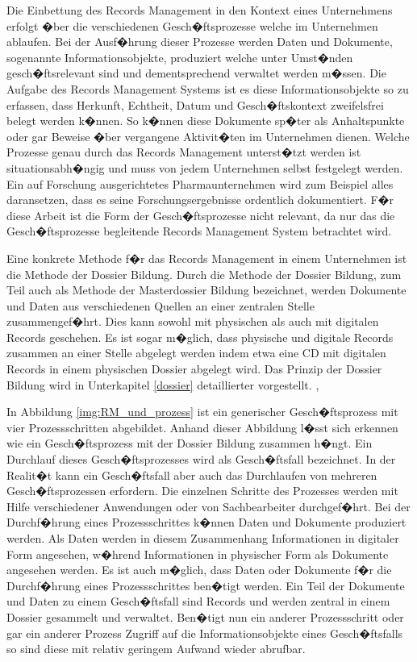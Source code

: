 \documentclass[a4paper,twoside,10pt]{report}
\begin{document}
Die Einbettung des Records Management in den Kontext eines Unternehmens erfolgt �ber die verschiedenen Gesch�ftsprozesse welche im Unternehmen ablaufen. Bei der Ausf�hrung dieser Prozesse werden Daten und Dokumente, sogenannte Informationsobjekte, produziert welche unter Umst�nden gesch�ftsrelevant sind und dementsprechend verwaltet werden m�ssen. Die Aufgabe des Records Management Systems ist es diese Informationsobjekte so zu erfassen, dass Herkunft, Echtheit, Datum und Gesch�ftskontext zweifelsfrei belegt werden k�nnen. So k�nnen diese Dokumente sp�ter als Anhaltspunkte oder gar Beweise �ber vergangene Aktivit�ten im Unternehmen dienen. Welche Prozesse genau durch das Records Management unterst�tzt werden ist situationsabh�ngig und muss von jedem Unternehmen selbst festgelegt werden. Ein auf Forschung ausgerichtetes Pharmaunternehmen wird zum Beispiel alles daransetzen, dass es seine Forschungsergebnisse ordentlich dokumentiert. F�r diese Arbeit ist die Form der Gesch�ftsprozesse nicht relevant, da nur das die Gesch�ftsprozesse begleitende Records Management System betrachtet wird. \cite{krm}

Eine konkrete Methode f�r das Records Management in einem Unternehmen ist die Methode der Dossier Bildung. Durch die Methode der Dossier Bildung, zum Teil auch als Methode der Masterdossier Bildung bezeichnet, werden Dokumente und Daten aus verschiedenen Quellen an einer zentralen Stelle zusammengef�hrt. Dies kann sowohl mit physischen als auch mit digitalen Records geschehen. Es ist sogar m�glich, dass physische und digitale Records zusammen an einer Stelle abgelegt werden indem etwa eine CD mit digitalen Records in einem physischen Dossier abgelegt wird. Das Prinzip der Dossier Bildung wird in Unterkapitel \ref{dossier} detaillierter vorgestellt. \cite{rmHandbook}, \cite{rmGest}

In Abbildung \ref{img:RM_und_prozess} ist ein generischer Gesch�ftsprozess mit vier Prozessschritten abgebildet. Anhand dieser Abbildung l�sst sich erkennen wie ein Gesch�ftsprozess mit der Dossier Bildung zusammen h�ngt. Ein Durchlauf dieses Gesch�ftsprozesses wird als Gesch�ftsfall bezeichnet. In der Realit�t kann ein Gesch�ftsfall aber auch das Durchlaufen von mehreren Gesch�ftsprozessen erfordern. Die einzelnen Schritte des Prozesses werden mit Hilfe verschiedener Anwendungen oder von Sachbearbeiter durchgef�hrt. Bei der Durchf�hrung eines Prozessschrittes k�nnen Daten und Dokumente produziert werden. Als Daten werden in diesem Zusammenhang Informationen in digitaler Form angesehen, w�hrend Informationen in physischer Form als Dokumente angesehen werden. Es ist auch m�glich, dass Daten oder Dokumente f�r die Durchf�hrung eines Prozessschrittes ben�tigt werden. Ein Teil der Dokumente und Daten zu einem Gesch�ftsfall sind Records und werden zentral in einem Dossier gesammelt und verwaltet. Ben�tigt nun ein anderer Prozessschritt oder gar ein anderer Prozess Zugriff auf die Informationsobjekte eines Gesch�ftsfalls so sind diese mit relativ geringem Aufwand wieder abrufbar. \cite{rmHandbook}
\end{document}
